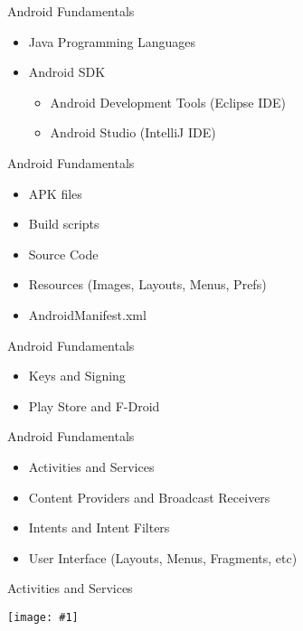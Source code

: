 \documentclass[14pt]{beamer}
\author{Andy Spencer}
\newcommand{\screen}[1]{
  \setlength{\leftmargin}{0pt}
  \setlength{\rightmargin}{0pt}
  \begin{center}
    \texttt{[image: \#1]}
  \end{center}
}
\begin{document}
\begin{frame}{Android Fundamentals}
  \begin{itemize}
    \item Java Programming Languages
    \item Android SDK
      \begin{itemize}
        \item Android Development Tools (Eclipse IDE)
        \item Android Studio (IntelliJ IDE)
      \end{itemize}
  \end{itemize}
\end{frame}

\begin{frame}{Android Fundamentals}
  \begin{itemize}
    \item APK files
    \item Build scripts
    \item Source Code
    \item Resources (Images, Layouts, Menus, Prefs)
    \item AndroidManifest.xml
  \end{itemize}
\end{frame}
  
\begin{frame}{Android Fundamentals}
  \begin{itemize}
    \item Keys and Signing
    \item Play Store and F-Droid
  \end{itemize}
\end{frame}

\begin{frame}{Android Fundamentals}
  \begin{itemize}
    \item Activities and Services
    \item Content Providers and Broadcast Receivers
    \item Intents and Intent Filters
    \item User Interface (Layouts, Menus, Fragments, etc)
  \end{itemize}
\end{frame}

\begin{frame}{Activities and Services}
  \screen{../images/components.pdf}
\end{frame}
\end{document}
